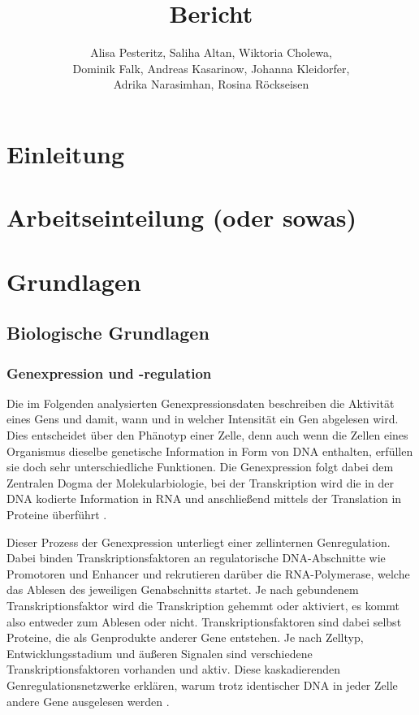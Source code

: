 \documentclass[12pt]{article}
\title{Bericht}
\author{Alisa Pesteritz, Saliha Altan, Wiktoria Cholewa, \\ 
	Dominik Falk, Andreas Kasarinow, Johanna Kleidorfer, \\
	Adrika Narasimhan, Rosina Röckseisen}
\begin{document}
\newpage
\maketitle

\newpage
\pagestyle{fancy}
\fancyhead{}
\section{Einleitung}
\label{einleitung}

\section{Arbeitseinteilung (oder sowas)}
\label{arbeitseinteilung}

\section{Grundlagen}
\label{grundlagen}

\subsection{Biologische Grundlagen}
\label{bio-grundlagen}

\subsubsection{Genexpression und -regulation}

Die im Folgenden analysierten Genexpressionsdaten beschreiben die Aktivität eines Gens und damit, wann und in welcher Intensität ein Gen abgelesen wird. Dies entscheidet über den Phänotyp einer Zelle, denn auch wenn die Zellen eines Organismus dieselbe genetische Information in Form von DNA enthalten, erfüllen sie doch sehr unterschiedliche Funktionen. Die Genexpression folgt dabei dem Zentralen Dogma der Molekularbiologie, bei der Transkription wird die in der DNA kodierte Information in RNA und anschließend mittels der Translation in Proteine überführt \cite{LeeYoung2013}.

Dieser Prozess der Genexpression unterliegt einer zellinternen Genregulation. Dabei binden Transkriptionsfaktoren an regulatorische DNA-Abschnitte wie Promotoren und Enhancer und rekrutieren darüber die RNA-Polymerase, welche das Ablesen des jeweiligen Genabschnitts startet. Je nach gebundenem Transkriptionsfaktor wird die Transkription gehemmt oder aktiviert, es kommt also entweder zum Ablesen oder nicht. Transkriptionsfaktoren sind dabei selbst Proteine, die als Genprodukte anderer Gene entstehen. Je nach Zelltyp, Entwicklungsstadium und äußeren Signalen sind verschiedene Transkriptionsfaktoren vorhanden und aktiv. Diese kaskadierenden Genregulationsnetzwerke erklären, warum trotz identischer DNA in jeder Zelle andere Gene ausgelesen werden \cite{LeeYoung2013}.
\end{document}

